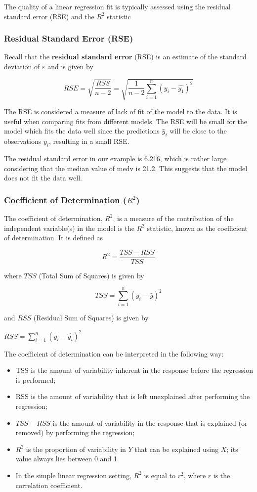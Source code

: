 \documentclass[11pt]{article}
\begin{document}
The quality of a linear regression fit is typically assessed using the residual standard error (RSE) and the $R^2$ statistic

\subsubsection{Residual Standard Error (RSE)}

Recall that the \textbf{residual standard error} (RSE) is an estimate of the standard deviation of \(\varepsilon\) and is given by

\[RSE = \sqrt{\frac{RSS}{n - 2}} = \sqrt{\dfrac{1}{n-2} \sum_{i=1}^{n} (y_i - \hat{y_1})^2}\]

The RSE is considered a measure of lack of fit of the model to the data. It is useful when comparing fits from different models. The RSE will be small for the model which fits the data well since the predictions \( \hat{y}_i \) will be close to the observations \( y_i \), resulting in a small RSE.

The residual standard error in our example is 6.216, which is rather large considering that the median value of medv is 21.2. This suggests that the model does not fit the data well.

\subsubsection{Coefficient of Determination (\( R^2 \))}

The coefficient of determination, \(R^2\), is a measure of the contribution of the independent variable(s) in the model is the $R^2$ statistic, known as the coefficient of determination. It is defined as

\[R^2 = \dfrac{TSS - RSS}{TSS}\]

where \(TSS\) (Total Sum of Squares) is given by

\[TSS = \sum_{i=1}^{n} (y_i - \bar{y})^2\]

and \(RSS\) (Residual Sum of Squares) is given by

\( RSS = \sum_{i=1}^{n} (y_i - \hat{y_i})^2\)

The coefficient of determination can be interpreted in the following way:

\begin{itemize}
    \item TSS is the amount of variability inherent in the response before the regression is performed;
    \item RSS is the amount of variability that is left unexplained after performing the regression;
    \item \(TSS - RSS\) is the amount of variability in the response that is explained (or removed) by performing the regression;
    \item \(R^2\) is the proportion of variability in \(Y\) that can be explained using \(X\); its value always lies between 0 and 1.
    \item In the simple linear regression setting, \(R^2\) is equal to \(r^2\), where \(r\) is the correlation coefficient.
\end{itemize}
\end{document}
